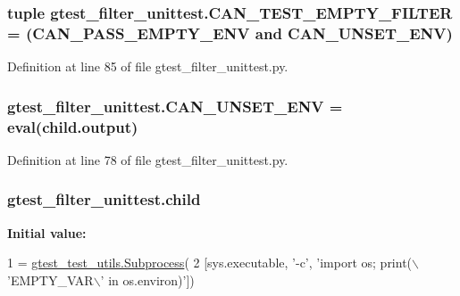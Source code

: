 \subsubsection[{\texorpdfstring{C\+A\+N\+\_\+\+T\+E\+S\+T\+\_\+\+E\+M\+P\+T\+Y\+\_\+\+F\+I\+L\+T\+ER}{CAN_TEST_EMPTY_FILTER}}]{\setlength{\rightskip}{0pt plus 5cm}tuple gtest\+\_\+filter\+\_\+unittest.\+C\+A\+N\+\_\+\+T\+E\+S\+T\+\_\+\+E\+M\+P\+T\+Y\+\_\+\+F\+I\+L\+T\+ER = ({\bf C\+A\+N\+\_\+\+P\+A\+S\+S\+\_\+\+E\+M\+P\+T\+Y\+\_\+\+E\+NV} and {\bf C\+A\+N\+\_\+\+U\+N\+S\+E\+T\+\_\+\+E\+NV})}\hypertarget{namespacegtest__filter__unittest_a7afca8c162042da19f58cb569805d627}{}\label{namespacegtest__filter__unittest_a7afca8c162042da19f58cb569805d627}


Definition at line 85 of file gtest\+\_\+filter\+\_\+unittest.\+py.

\subsubsection[{\texorpdfstring{C\+A\+N\+\_\+\+U\+N\+S\+E\+T\+\_\+\+E\+NV}{CAN_UNSET_ENV}}]{\setlength{\rightskip}{0pt plus 5cm}gtest\+\_\+filter\+\_\+unittest.\+C\+A\+N\+\_\+\+U\+N\+S\+E\+T\+\_\+\+E\+NV = eval(child.\+output)}\hypertarget{namespacegtest__filter__unittest_ab9e86ba00496d09ea6830a60e3eb3cc0}{}\label{namespacegtest__filter__unittest_ab9e86ba00496d09ea6830a60e3eb3cc0}


Definition at line 78 of file gtest\+\_\+filter\+\_\+unittest.\+py.

\subsubsection[{\texorpdfstring{child}{child}}]{\setlength{\rightskip}{0pt plus 5cm}gtest\+\_\+filter\+\_\+unittest.\+child}\hypertarget{namespacegtest__filter__unittest_a1bb380432b61dc7972355aeb5c457c03}{}\label{namespacegtest__filter__unittest_a1bb380432b61dc7972355aeb5c457c03}
{\bfseries Initial value\+:}
\begin{DoxyCode}
1 = \hyperlink{classgtest__test__utils_1_1_subprocess}{gtest\_test\_utils.Subprocess}(
2     [sys.executable, \textcolor{stringliteral}{'-c'}, \textcolor{stringliteral}{'import os; print(\(\backslash\)'EMPTY\_VAR\(\backslash\)' in os.environ)'}])
\end{DoxyCode}


